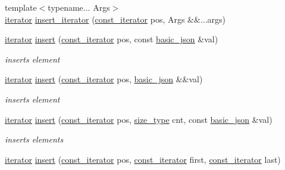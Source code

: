 \begin{DoxyCompactItemize}
{\footnotesize template$<$typename... Args$>$ }\\\hyperlink{classnlohmann_1_1basic__json_a099316232c76c034030a38faa6e34dca}{iterator} \hyperlink{classnlohmann_1_1basic__json_af0c76745fc0ef3a198dbab1706166663}{insert\+\_\+iterator} (\hyperlink{classnlohmann_1_1basic__json_a41a70cf9993951836d129bb1c2b3126a}{const\+\_\+iterator} pos, Args \&\&...args)
\item 
\hyperlink{classnlohmann_1_1basic__json_a099316232c76c034030a38faa6e34dca}{iterator} \hyperlink{classnlohmann_1_1basic__json_a0136728f5db69d4051c77b94307abd6c}{insert} (\hyperlink{classnlohmann_1_1basic__json_a41a70cf9993951836d129bb1c2b3126a}{const\+\_\+iterator} pos, const \hyperlink{classnlohmann_1_1basic__json}{basic\+\_\+json} \&val)
\begin{DoxyCompactList}\small\item\em inserts element \end{DoxyCompactList}\item 
\hyperlink{classnlohmann_1_1basic__json_a099316232c76c034030a38faa6e34dca}{iterator} \hyperlink{classnlohmann_1_1basic__json_a1ecce113ff11dd294689ee4d45cbb855}{insert} (\hyperlink{classnlohmann_1_1basic__json_a41a70cf9993951836d129bb1c2b3126a}{const\+\_\+iterator} pos, \hyperlink{classnlohmann_1_1basic__json}{basic\+\_\+json} \&\&val)
\begin{DoxyCompactList}\small\item\em inserts element \end{DoxyCompactList}\item 
\hyperlink{classnlohmann_1_1basic__json_a099316232c76c034030a38faa6e34dca}{iterator} \hyperlink{classnlohmann_1_1basic__json_a30a7cc24f2931c20ecae37ec4a5e901f}{insert} (\hyperlink{classnlohmann_1_1basic__json_a41a70cf9993951836d129bb1c2b3126a}{const\+\_\+iterator} pos, \hyperlink{classnlohmann_1_1basic__json_a39f2cd0b58106097e0e67bf185cc519b}{size\+\_\+type} cnt, const \hyperlink{classnlohmann_1_1basic__json}{basic\+\_\+json} \&val)
\begin{DoxyCompactList}\small\item\em inserts elements \end{DoxyCompactList}\item 
\hyperlink{classnlohmann_1_1basic__json_a099316232c76c034030a38faa6e34dca}{iterator} \hyperlink{classnlohmann_1_1basic__json_a404cfe1bdbf1dc6b229627fcf2afb95f}{insert} (\hyperlink{classnlohmann_1_1basic__json_a41a70cf9993951836d129bb1c2b3126a}{const\+\_\+iterator} pos, \hyperlink{classnlohmann_1_1basic__json_a41a70cf9993951836d129bb1c2b3126a}{const\+\_\+iterator} first, \hyperlink{classnlohmann_1_1basic__json_a41a70cf9993951836d129bb1c2b3126a}{const\+\_\+iterator} last)

\end{DoxyCompactItemize}
